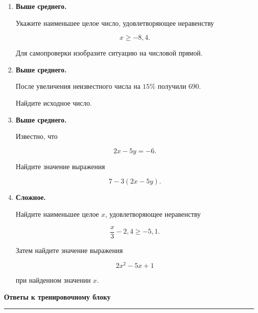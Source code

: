 \documentclass[a4paper,12pt]{article}
\newcommand{\sectiontitle}[1]{%
  \vspace{0.6em}%
  {\Large\bfseries\textcolor{darkaccent}{#1}}\par
  \vspace{0.25em}%
  {\color{linegray}\rule{\linewidth}{0.6pt}}\par
  \vspace{0.5em}%
}
\begin{document}
\begin{enumerate}
Расположите в порядке возрастания числа

\[
-\frac{11}{12},
\qquad
-\frac56,
\qquad
-\frac78.
\]

Используйте общий знаменатель.


\item
\textbf{Выше среднего.}

Укажите наименьшее целое число,
удовлетворяющее неравенству

\[
x\ge -8{,}4.
\]

Для самопроверки изобразите ситуацию
на числовой прямой.


\item
\textbf{Выше среднего.}

После увеличения неизвестного числа на $15\%$
получили $690$.

Найдите исходное число.


\item
\textbf{Выше среднего.}

Известно, что

\[
2x-5y=-6.
\]

Найдите значение выражения

\[
7-3(2x-5y).
\]


\item
\textbf{Сложное.}

Найдите наименьшее целое $x$,
удовлетворяющее неравенству

\[
\frac{x}{3}-2{,}4\ge -5{,}1.
\]

Затем найдите значение выражения

\[
2x^2-5x+1
\]

при найденном значении $x$.

\end{enumerate}


\clearpage

\sectiontitle{Ответы к тренировочному блоку}

\renewcommand{\arraystretch}{1.35}
\end{document}

